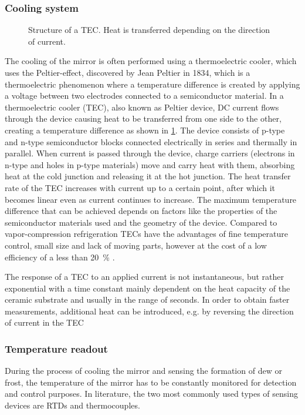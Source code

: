 \clearpage
\subsubsection{Cooling system}\label{s:peltier}
\begin{figure}
    
    \caption{Structure of a TEC. Heat is transferred depending on the direction of current.}
    \label{d:peltier}
\end{figure}

The cooling of the mirror is often performed using a thermoelectric cooler, which uses the Peltier-effect, discovered by Jean Peltier in 1834, which is a thermoelectric phenomenon where a temperature difference is created by applying a voltage between two electrodes connected to a semiconductor material. In a thermoelectric cooler (TEC), also known as Peltier device, DC current flows through the device causing heat to be transferred from one side to the other, creating a temperature difference as shown in \cref{d:peltier}. The device consists of p-type and n-type semiconductor blocks connected electrically in series and thermally in parallel. When current is passed through the device, charge carriers (electrons in n-type and holes in p-type materials) move and carry heat with them, absorbing heat at the cold junction and releasing it at the hot junction. The heat transfer rate of the TEC increases with current up to a certain point, after which it becomes linear even as current continues to increase. The maximum temperature difference that can be achieved depends on factors like the properties of the semiconductor materials used and the geometry of the device. Compared to vapor-compression refrigeration TECs have the advantages of fine temperature control, small size and lack of moving parts, however at the cost of a low efficiency of a less than \qty{20}{\percent} \autocite{caiThermoelectricCoolingTechnology2019a,zhangThermoelectricMaterialsEnergy2015}.

The response of a TEC to an applied current is not instantaneous, but rather exponential with a time constant mainly dependent on the heat capacity of the ceramic substrate and usually in the range of seconds. In order to obtain faster measurements, additional heat can be introduced, e.g. by reversing the direction of current in the TEC \autocite{pascal-delannoyFastHumiditySensor1998}

\subsubsection{Temperature readout}
During the process of cooling the mirror and sensing the formation of dew or frost, the temperature of the mirror has to be constantly monitored for detection and control purposes. In literature, the two most commonly used types of sensing devices are  \glspl{RTD} and thermocouples. 

